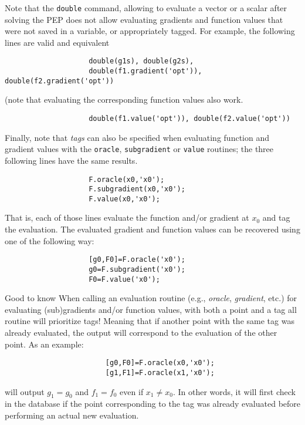 \documentclass[11pt,a4paper]{article}
\begin{document}
					Note that the \verb?double? command, allowing to evaluate a vector or a scalar after solving the PEP does not allow evaluating gradients and function values that were not saved in a variable, or appropriately tagged. For example, the following lines are valid and equivalent\\[-1cm]
					\begin{lstlisting}
					double(g1s), double(g2s),
					double(f1.gradient('opt')), double(f2.gradient('opt'))
					\end{lstlisting}
					(note that evaluating the corresponding function values also work.\\[-1cm]
					\begin{lstlisting}
					double(f1.value('opt')), double(f2.value('opt'))
					\end{lstlisting}
					Finally, note that \emph{tags} can also be specified when evaluating function and gradient values with the \verb?oracle?, \verb?subgradient? or \verb?value? routines; the three following lines have the same results.\\[-1cm]
					\begin{lstlisting}
					F.oracle(x0,'x0');
					F.subgradient(x0,'x0');
					F.value(x0,'x0');
					\end{lstlisting}
					That is, each of those lines evaluate the function and/or gradient at $x_0$ and tag the evaluation. The evaluated gradient and function values can be recovered using one of the  following way:\\[-1cm]
					\begin{lstlisting}
					[g0,F0]=F.oracle('x0');
					g0=F.subgradient('x0');
					F0=F.value('x0');
					\end{lstlisting}
					\begin{bclogo}[logo=\bcattention, couleur=blue!30, arrondi =0.1, sousTitre=Specifying both a tag a a point]{Good to know}
						When calling an evaluation routine (e.g., \emph{oracle}, \emph{gradient}, etc.) for evaluating (sub)gradients and/or function values, with both a point and a tag all routine will prioritize tags! Meaning that if another point with the same tag was already evaluated, the output will correspond to the evaluation of the other point. As an example:\\[-1cm]
						\begin{lstlisting}
						[g0,F0]=F.oracle(x0,'x0');
						[g1,F1]=F.oracle(x1,'x0');
						\end{lstlisting}
						will output $g_1=g_0$ and $f_1=f_0$ even if $x_1\neq x_0$. In other words, it will first check in the database if the point corresponding to the tag was already evaluated before performing an actual new evaluation.
					\end{bclogo}
					\clearpage
\end{document}
